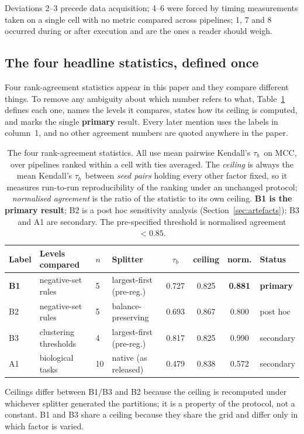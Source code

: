 \documentclass[11pt,a4paper]{article}
\newcommand{\taub}{Kendall's $\tau_b$}
\begin{document}
Deviations 2--3 precede data acquisition; 4--6 were forced by timing measurements taken on
a single cell with no metric compared across pipelines; 1, 7 and 8 occurred during or after
execution and are the ones a reader should weigh.

\subsection{The four headline statistics, defined once}
\label{sec:definitions}

Four rank-agreement statistics appear in this paper and they compare different things. To
remove any ambiguity about which number refers to what, Table~\ref{tab:definitions} defines
each one, names the levels it compares, states how its ceiling is computed, and marks the
single \textbf{primary} result. Every later mention uses the labels in column~1, and no
other agreement numbers are quoted anywhere in the paper.

\begin{table}[htbp]\centering\small
\caption{The four rank-agreement statistics. All use mean pairwise \taub\ on MCC, over
pipelines ranked within a cell with ties averaged. The \emph{ceiling} is always the mean
\taub\ between \emph{seed pairs} holding every other factor fixed, so it measures
run-to-run reproducibility of the ranking under an unchanged protocol; \emph{normalised
agreement} is the ratio of the statistic to its own ceiling. \textbf{B1 is the primary
result}; B2 is a post hoc sensitivity analysis (Section~\ref{sec:artefacts}); B3 and A1 are
secondary. The pre-specified threshold is normalised agreement $<0.85$.}
\label{tab:definitions}
\begin{tabular}{llllcccl}
\toprule
Label & Levels compared & $n$ & Splitter & $\tau_b$ & ceiling & norm. & Status \\
\midrule
\textbf{B1} & negative-set rules & 5 & largest-first (pre-reg.) & 0.727 & 0.825 & \textbf{0.881} & \textbf{primary} \\
B2 & negative-set rules & 5 & balance-preserving & 0.693 & 0.867 & 0.800 & post hoc \\
B3 & clustering thresholds & 4 & largest-first (pre-reg.) & 0.817 & 0.825 & 0.990 & secondary \\
A1 & biological tasks & 10 & native (as released) & 0.479 & 0.838 & 0.572 & secondary \\
\bottomrule
\end{tabular}

\vspace{3pt}
\footnotesize\raggedright
Ceilings differ between B1/B3 and B2 because the ceiling is recomputed under whichever
splitter generated the partitions; it is a property of the protocol, not a constant. B1 and
B3 share a ceiling because they share the grid and differ only in which factor is varied.
\end{table}
\end{document}
